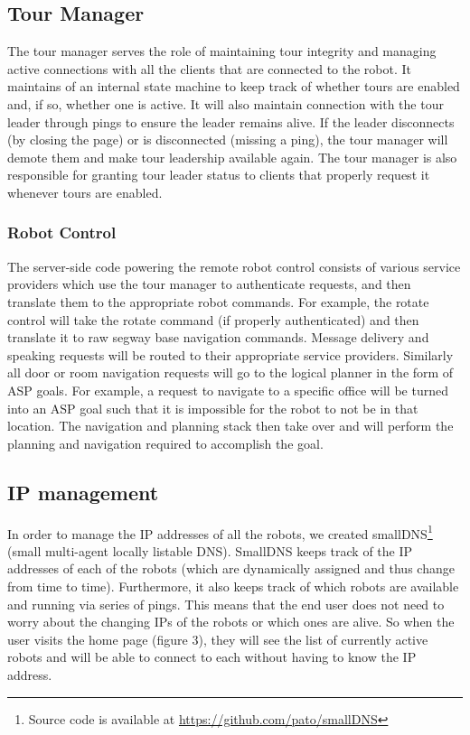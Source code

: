 \documentclass[
  oneside,
  11pt, a4paper,
  footinclude=true,
  headinclude=true,
  cleardoublepage=empty
]{article}
\begin{document}
\subsection{Tour Manager}

The tour manager serves the role of maintaining tour integrity and managing
active connections with all the clients that are connected to the robot. It
maintains of an internal state machine to keep track of whether tours are
enabled and, if so, whether one is active. It will also maintain connection
with the tour leader through pings to ensure the leader remains alive. If the
leader disconnects (by closing the page) or is disconnected (missing a ping),
the tour manager will demote them and make tour leadership available again. The
tour manager is also responsible for granting tour leader status to clients
that properly request it whenever tours are enabled.

\subsubsection{Robot Control}

The server-side code powering the remote robot control consists of various
service providers which use the tour manager to authenticate requests, and then
translate them to the appropriate robot commands. For example, the rotate
control will take the rotate command (if properly authenticated) and then
translate it to raw segway base navigation commands. Message delivery and
speaking requests will be routed to their appropriate service providers.
Similarly all door or room navigation requests will go to the logical planner
in the form of ASP goals. For example, a request to navigate to a specific
office will be turned into an ASP goal such that it is impossible for the robot
to not be in that location. The navigation and planning stack then take over
and will perform the planning and navigation required to accomplish the goal.

\subsection{IP management}

In order to manage the IP addresses of all the robots, we created
smallDNS\footnote{Source code is available at
\url{https://github.com/pato/smallDNS}} (small multi-agent locally listable
DNS). SmallDNS keeps track of the IP addresses of each of the robots (which are
dynamically assigned and thus change from time to time). Furthermore, it also
keeps track of which robots are available and running via series of pings. This
means that the end user does not need to worry about the changing IPs of the
robots or which ones are alive. So when the user visits the home page (figure
3), they will see the list of currently active robots and will be able to
connect to each without having to know the IP address.
\end{document}
